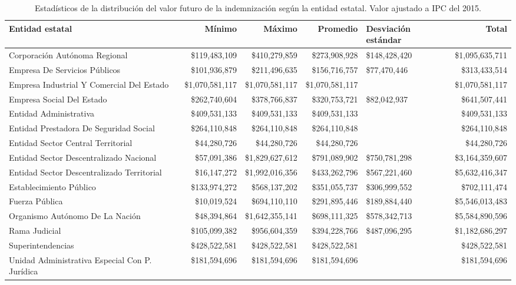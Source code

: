 \begin{sidewaystable}[htbp]
\centering
\caption{Estadísticos de la distribución del
valor futuro de la indemnización según la entidad estatal. Valor ajustado a IPC del 2015.} 
\label{tab:indementidad}
\begin{tabular}{p{6cm}rrrR{2.8cm}r}
  \hline
Entidad estatal & Mínimo & Máximo & Promedio & Desviación estándar & Total \\ 
  \hline
Corporación Autónoma Regional & \$119,483,109 & \$410,279,859 & \$273,908,928 & \$148,428,420 & \$1,095,635,711 \\ 
  Empresa De Servicios Públicos & \$101,936,879 & \$211,496,635 & \$156,716,757 & \$77,470,446 & \$313,433,514 \\ 
  Empresa Industrial Y Comercial Del Estado & \$1,070,581,117 & \$1,070,581,117 & \$1,070,581,117 &  & \$1,070,581,117 \\ 
  Empresa Social Del Estado & \$262,740,604 & \$378,766,837 & \$320,753,721 & \$82,042,937 & \$641,507,441 \\ 
  Entidad Administrativa & \$409,531,133 & \$409,531,133 & \$409,531,133 &  & \$409,531,133 \\ 
  Entidad Prestadora De Seguridad Social & \$264,110,848 & \$264,110,848 & \$264,110,848 &  & \$264,110,848 \\ 
  Entidad Sector Central Territorial & \$44,280,726 & \$44,280,726 & \$44,280,726 &  & \$44,280,726 \\ 
  Entidad Sector Descentralizado Nacional & \$57,091,386 & \$1,829,627,612 & \$791,089,902 & \$750,781,298 & \$3,164,359,607 \\ 
  Entidad Sector Descentralizado Territorial & \$16,147,272 & \$1,992,016,356 & \$433,262,796 & \$567,221,460 & \$5,632,416,347 \\ 
  Establecimiento Público & \$133,974,272 & \$568,137,202 & \$351,055,737 & \$306,999,552 & \$702,111,474 \\ 
  Fuerza Pública & \$10,019,524 & \$694,110,110 & \$291,895,446 & \$189,884,440 & \$5,546,013,483 \\ 
  Organismo Autónomo De La Nación & \$48,394,864 & \$1,642,355,141 & \$698,111,325 & \$578,342,713 & \$5,584,890,596 \\ 
  Rama Judicial & \$105,099,382 & \$956,604,359 & \$394,228,766 & \$487,096,295 & \$1,182,686,297 \\ 
  Superintendencias & \$428,522,581 & \$428,522,581 & \$428,522,581 &  & \$428,522,581 \\ 
  Unidad Administrativa Especial Con P. Jurídica & \$181,594,696 & \$181,594,696 & \$181,594,696 &  & \$181,594,696 \\ 
   \hline
\end{tabular}
\end{sidewaystable}
